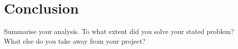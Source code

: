 \section{Conclusion}
\label{sec:conclusion}

Summarise your analysis. To what extent did you solve your stated problem? What else do you take away from your project?